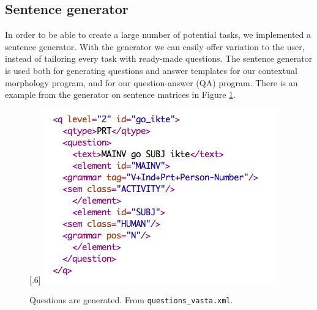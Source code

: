 \documentclass[11pt]{article}
\begin{document}
\subsection{Sentence generator}\label{set}
In order to be able to create a large number of potential tasks, we implemented a sentence generator. With the generator we can easily offer variation to the user, instead of tailoring every task with ready-made questions. The sentence generator is used both for generating questions and answer templates for our contextual morphology program, and for our question-answer (QA) program. There is an example from the generator on sentence matrices in Figure \ref{questionv}.

\begin{figure}[htbp]
\begin{center}
\scalebox{.6}[.6]{\includegraphics{presentation/img/question_vasta.png}}\\
\caption{Questions are generated. From \texttt{questions\_vasta.xml}.}
\label{questionv}
\end{center}
\end{figure}
\end{document}
